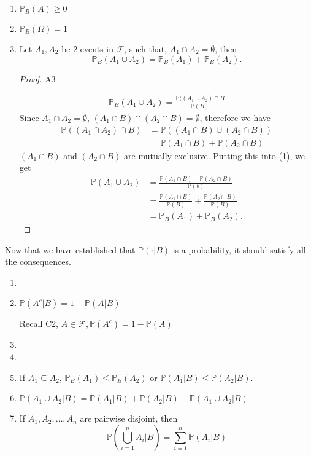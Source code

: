 \documentclass[10pt, a4paper]{article}
\begin{document}
\begin{enumerate}[label = A\arabic*]
    \item $\mathbb{P}_B(A) \geq 0$
    \item $\mathbb{P}_B(\Omega) = 1$
    \item Let $A_1, A_2$ be $2$ events in $\mathcal{F}$, such that, $A_1 \cap A_2 = \emptyset$, then
    \[
    \mathbb{P}_B(A_1 \cup A_2) = \mathbb{P}_B(A_1) + \mathbb{P}_B(A_2).
    \]
    \begin{proof}
        A3

        \begin{gather}
        \mathbb{P}_B(A_1 \cup A_2) = \frac{\mathbb{P}((A_1 \cup A_2) \cap B}{\mathbb{P}(B)}          
        \end{gather}
        Since $A_1 \cap A_2 = \emptyset$, $(A_1 \cap B) \cap (A_2 \cap B) = \emptyset$, therefore we have
        \begin{align*}
            \mathbb{P}((A_1 \cap A_2) \cap B) &= \mathbb{P}((A_1 \cap B) \cup (A_2 \cap B)) \\
            &= \mathbb{P}(A_1 \cap B) + \mathbb{P}(A_2 \cap B)
        \end{align*}
        $(A_1 \cap B)$ and $(A_2 \cap B)$ are mutually exclusive. Putting this into (1), we get
        \begin{align*}
        \mathbb{P}(A_1 \cup A_2) &= \frac{\mathbb{P}(A_1 \cap B) + \mathbb{P}(A_2 \cap B)}{\mathbb{P}(b)} \\
        &= \frac{\mathbb{P}(A_1 \cap B)}{\mathbb{P}(B)} + \frac{\mathbb{P}(A_2 \cap B)}{\mathbb{P}(B)} \\
        &= \mathbb{P}_B(A_1) + \mathbb{P}_B(A_2).
        \end{align*}
    \end{proof}
\end{enumerate}

Now that we have established that $\mathbb{P}(\cdot | B)$ is a probability, it should satisfy all the consequences.
\begin{enumerate}[label = C\arabic*]
    \item \phantom{}
    \item $\mathbb{P}(A ^ c | B) = 1 - \mathbb{P}(A | B)$

    Recall C2, $A \in \mathcal{F}, \mathbb{P}(A ^ c) = 1 - \mathbb{P}(A)$
    \item \phantom{}
    \item \phantom{}
    \item If $A_1 \subseteq A_2,\, \mathbb{P}_B(A_1) \leq \mathbb{P}_B(A_2)$ or $\mathbb{P}(A_1 | B) \leq \mathbb{P}(A_2 | B)$.
    \item $\mathbb{P}(A_1 \cup A_2 | B) = \mathbb{P}(A_1 | B) + \mathbb{P}(A_2 | B) - \mathbb{P}(A_1 \cup A_2 | B)$
    \item If $A_1, A_2,\dotsc, A_n$ are pairwise disjoint, then
    \[
    \mathbb{P}\left(\bigcup_{i = 1}^{n}A_i|B\right) = \sum_{i = 1}^{n}\mathbb{P}(A_i | B)
    \]
\end{enumerate}
\end{document}
